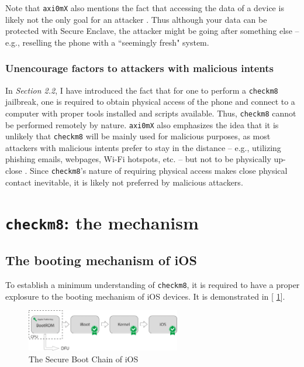 \documentclass[10pt]{article}
\newcommand{\inlinecode}{\texttt}
\begin{document}
Note that \inlinecode{axi0mX} also mentions the fact that accessing the data of a device is likely not the only goal for an attacker \cite{cite:3}. Thus although your data can be protected with Secure Enclave, the attacker might be going after something else -- e.g., reselling the phone with a ``seemingly fresh" system.

\subsubsection{Unencourage factors to attackers with malicious intents}
In \textit{Section 2.2}, I have introduced the fact that for one to perform a \inlinecode{checkm8} jailbreak, one is required to obtain physical access of the phone and connect to a computer with proper tools installed and scripts available. Thus, \inlinecode{checkm8} cannot be performed remotely by nature. \inlinecode{axi0mX} also emphasizes the idea that it is unlikely that \inlinecode{checkm8} will be mainly used for malicious purposes, as most attackers with malicious intents prefer to stay in the distance -- e.g., utilizing phishing emails, webpages, Wi-Fi hotspots, etc. -- but not to be physically up-close \cite{cite:3}. Since \inlinecode{checkm8}'s nature of requiring physical access makes close physical contact inevitable, it is likely not preferred by malicious attackers.

\section{\inlinecode{checkm8}: the mechanism}
\subsection{The booting mechanism of iOS}

To establish a minimum understanding of \inlinecode{checkm8}, it is required to have a proper explosure to the booting mechanism of iOS devices. It is demonstrated in [\figurename{ \ref{figure_1}}].
\begin{figure}[!ht]
    \centering
    \includegraphics[width = 0.6\textwidth]{figure_1}
    \caption{The Secure Boot Chain of iOS \protect\cite{cite:4}}
    \label{figure_1}
\end{figure}
\end{document}
